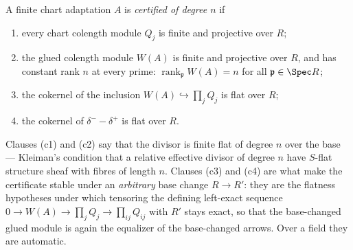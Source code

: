 \begin{definition}
  \label{def:isCertified}
  \leanok
  A finite chart adaptation \(A\) is \emph{certified of degree \(n\)} if
  \begin{enumerate}
    \item[(c1)] every chart colength module \(Q_j\) is finite and projective over \(R\);
    \item[(c2)] the glued colength module \(W(A)\) is finite and projective over \(R\), and
      has constant rank \(n\) at every prime: \(\operatorname{rank}_{\mathfrak p} W(A) = n\)
      for all \(\mathfrak p \in \Spec R\);
    \item[(c3)] the cokernel of the inclusion \(W(A) \hookrightarrow \prod_j Q_j\) is flat
      over \(R\);
    \item[(c4)] the cokernel of \(\delta^- - \delta^+\) is flat over \(R\).
  \end{enumerate}
  Clauses (c1) and (c2) say that the divisor is finite flat of degree \(n\) over the base
  --- Kleiman's condition that a relative effective divisor of degree \(n\) have
  \(S\)-flat structure sheaf with fibres of length \(n\). Clauses (c3) and (c4) are what
  make the certificate stable under an \emph{arbitrary} base change \(R \to R'\): they are
  the flatness hypotheses under which tensoring the defining left-exact sequence
  \(0 \to W(A) \to \prod_j Q_j \to \prod_{ij} Q_{ij}\) with \(R'\) stays exact, so that the
  base-changed glued module is again the equalizer of the base-changed arrows. Over a field
  they are automatic.
\end{definition}

